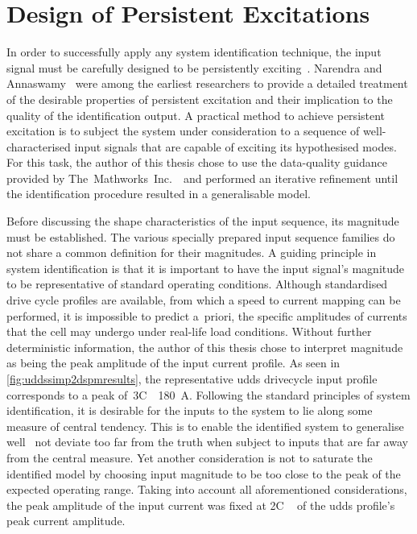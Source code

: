 \section{Design of Persistent Excitations}\label{sec:persistentexcitation}

In order  to successfully apply  any system identification technique,  the input
signal must be carefully  designed to be persistently exciting~\cite{Ljung1999}.
Narendra and Annaswamy~\cite{Narendra1984,Narendra1987}  were among the earliest
researchers  to provide  a detailed  treatment  of the  desirable properties  of
persistent excitation and their implication to the quality of the identification
output. A  practical method to achieve  persistent excitation is to  subject the
system under  consideration to  a sequence  of well-characterised  input signals
that  are  capable of  exciting  its  hypothesised  modes.  For this  task,  the
author  of this  thesis  chose  to use  the  data-quality  guidance provided  by
The~Mathworks~Inc.~\cite{mathworkssysid}\ and performed  an iterative refinement
until the identification procedure resulted in a generalisable model.

Before discussing the shape characteristics of the input sequence, its magnitude
must be established.  The various specially prepared input  sequence families do
not  share a  common definition  for their  magnitudes. A  guiding principle  in
system  identification is  that  it  is important  to  have  the input  signal's
magnitude  to  be  representative  of standard  operating  conditions.  Although
standardised  drive  cycle  profiles  are  available,  from  which  a  speed  to
current mapping  can be  performed, it  is impossible  to predict  a~priori, the
specific  amplitudes of  currents  that  the cell  may  undergo under  real-life
load  conditions.  Without  further  deterministic information,  the  author  of
this  thesis  chose to  interpret  magnitude  as  being  the peak  amplitude  of
the  input  current profile.  As  seen  in \cref{fig:uddssimp2dspmresults},  the
representative  \gls{udds}  drivecycle  input  profile  corresponds  to  a  peak
of~3C~\ie~\SI{180}{\ampere}.  Following   the  standard  principles   of  system
identification, it is desirable  for the inputs to the system  to lie along some
measure  of  central tendency.  This  is  to  enable  the identified  system  to
generalise well  \ie~not deviate too far  from the truth when  subject to inputs
that are far away from the central  measure. Yet another consideration is not to
saturate the identified model by choosing input magnitude to be too close to the
peak of  the expected  operating range. Taking  into account  all aforementioned
considerations,  the  peak amplitude  of  the  input  current  was fixed  at  2C
\ie~ of the \gls{udds} profile's peak current amplitude.

